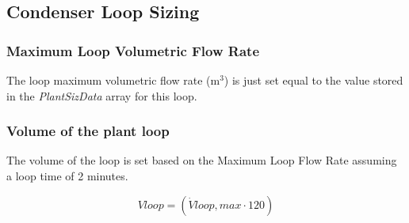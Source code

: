 \subsection{Condenser Loop Sizing}\label{condenser-loop-sizing}

\subsubsection{Maximum Loop Volumetric Flow Rate}\label{maximum-loop-volumetric-flow-rate-1}

The loop maximum volumetric flow rate (m\(^{3}\)) is just set equal to the value stored in the \emph{PlantSizData} array for this loop.

\subsubsection{Volume of the plant loop}\label{volume-of-the-plant-loop-1}

The volume of the loop is set based on the Maximum Loop Flow Rate assuming a loop time of 2 minutes.

\begin{equation}
Vloop = (\dot Vloop,max\cdot 120)
\end{equation}
